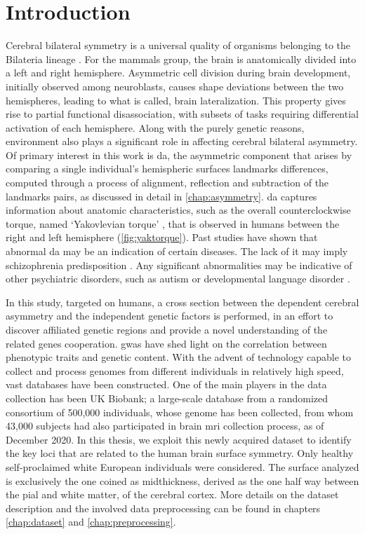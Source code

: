 \chapter{Introduction}\label{chap:introduction}

Cerebral bilateral symmetry is a universal quality of organisms belonging to the Bilateria lineage \cite{Corballis2009}\cite{Bailly2013}. For the mammals group, the brain is anatomically divided into a left and right hemisphere. Asymmetric cell division during brain development, initially observed among neuroblasts, causes shape deviations between the two hemispheres, leading to what is called, brain lateralization. This property gives rise to partial functional disassociation, with subsets of tasks requiring differential activation of each hemisphere.  Along with the purely genetic reasons, environment also plays a significant role in affecting cerebral bilateral asymmetry.  Of primary interest in this work is \ac{da}, the asymmetric component that arises by comparing a single individual's hemispheric surfaces landmarks differences, computed through a process of alignment, reflection and subtraction of the landmarks pairs, as discussed in detail in \autoref{chap:asymmetry}. \ac{da} captures information about anatomic characteristics, such as the overall counterclockwise torque, named `Yakovlevian torque' \cite{LeMay1976}, that is observed in humans between the right and left hemisphere (\autoref{fig:yaktorque}). Past studies have shown that abnormal \ac{da} may be an indication of certain diseases. The lack of it may imply schizophrenia predisposition \cite{Ribolsi2014}. Any significant abnormalities may be indicative of other psychiatric disorders, such as autism or developmental language disorder \cite{Herbert2005}\cite{Kong2022}. 

In this study, targeted on humans, a cross section between the dependent cerebral asymmetry and the independent genetic factors is performed, in an effort to discover affiliated genetic regions and provide a novel understanding of the related genes cooperation. \Ac{gwas} have shed light on the correlation between phenotypic traits and genetic content. With the advent of technology capable to collect and process genomes from different individuals in relatively high speed, vast databases have been constructed. One of the main players in the data collection has been UK Biobank; a large-scale database from a randomized consortium of 500,000 individuals, whose genome has been collected, from whom  43,000 subjects had also participated in brain \ac{mri} collection process, as of December 2020. In this thesis, we exploit this newly acquired dataset to identify the key loci that are related to the human brain surface symmetry. Only healthy self-proclaimed white European individuals were considered. The surface analyzed is exclusively the one coined as midthickness, derived as the one half way between the pial and white matter, of the cerebral cortex. More details on the dataset description and the involved data preprocessing can be found in chapters \ref{chap:dataset} and \ref{chap:preprocessing}.

